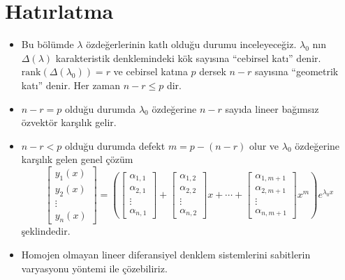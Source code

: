\documentclass[11pt,a4paper]{article}
\begin{document}
\newcommand\carp[1]{\mathpalette\carpb{#1}}%
\newcommand\carpb[2]{\tikz[baseline=(cc.base)]{\node[inner sep=0pt](cc){$#1#2$};\draw[line width=0.5pt](cc.south west)--(cc.north east);}}
\newcommand\carpt[1]{\mathpalette\carptb{#1}}%
\newcommand\carptb[2]{\tikz[baseline=(cc.base)]{\node[inner sep=0pt](cc){$#1#2$};\draw[line width=0.5pt](cc.north west)--(cc.south east);}}

\hfill{}
\section{Hatırlatma}
\begin{itemize}[label=$\ast$]
\item Bu bölümde $\lambda$ özdeğerlerinin katlı olduğu durumu inceleyeceğiz. $\lambda_0$ nın $\Delta(\lambda)$ karakteristik denklemindeki kök sayısına ``cebirsel katı'' denir. $\mathrm{rank}\left(\Delta(\lambda_0)\right) = r$ ve cebirsel katına $p$ dersek $n-r$ sayısına ``geometrik katı'' denir. Her zaman $n-r \le p$ dir.
\item $n-r = p$ olduğu durumda $\lambda_0$ özdeğerine $n-r$ sayıda lineer bağımsız özvektör karşılık gelir.
\item $n-r < p$ olduğu durumda defekt $m = p-(n-r)$ olur ve $\lambda_0$ özdeğerine karşılık gelen genel çözüm
\[
\begin{bmatrix} y_1(x) \\ y_2(x) \\ \vdots \\ y_n(x) \end{bmatrix} = \left(\begin{bmatrix} \alpha_{1,1} \\ \alpha_{2,1} \\ \vdots \\ \alpha_{n,1} \end{bmatrix} + \begin{bmatrix} \alpha_{1,2} \\ \alpha_{2,2} \\ \vdots \\ \alpha_{n,2} \end{bmatrix}x + \cdots + \begin{bmatrix} \alpha_{1,m+1} \\ \alpha_{2,m+1} \\ \vdots \\ \alpha_{n,m+1} \end{bmatrix}x^m\right)e^{\lambda_0 x}
\]
şeklindedir.
\item Homojen olmayan lineer diferansiyel denklem sistemlerini sabitlerin varyasyonu yöntemi ile çözebiliriz.
\end{itemize}
\end{document}
